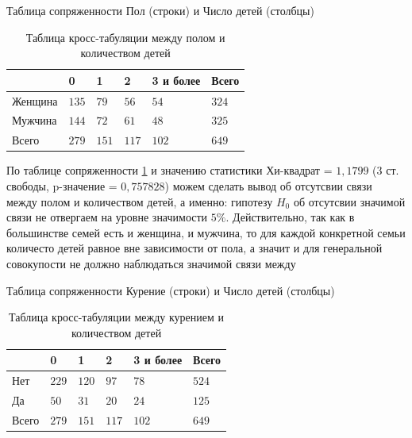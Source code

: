 \documentclass[a4paper,12pt]{article}
\begin{document}
\begin{table}[H]
	\begin{center}
		Таблица сопряженности Пол (строки) и Число детей (столбцы)\\
		
		\vspace{8pt}
		
		\begin{tabular}{|l|l|l|l|l|l|}
			\hline
			& 0 & 1 & 2 & 3 и более & Всего \\[1ex]
			\hline
			Женщина & $135$ & $79$ & $56$ & $54$ & $324$\\
			\hline
			Мужчина & $144$ & $72$ & $61$ & $48$ & $325$\\[1ex]
			\hline
			Всего & $279$ & $151$ & $117$ & $102$ & $649$\\
			\hline
		\end{tabular}
		\caption{Таблица кросс-табуляции между полом и количеством детей}
		\label{tab:cross2}
	\end{center}
\end{table}

По таблице сопряженности \ref{tab:cross2} и значению статистики Хи-квадрат = $1,1799$ (3 ст. свободы, p-значение = $0,757828$) можем сделать вывод об отсутсвии связи между полом и количеством детей, а именно: гипотезу $H_0$ об отсутсвии значимой связи не отвергаем на уровне значимости $5\%$. Действительно, так как в большинстве семей есть и женщина, и мужчина, то для каждой конкретной семьи количесто детей равное вне зависимости от пола, а значит и для генеральной совокупости не должно наблюдаться значимой связи между  

\begin{table}[H]
	\begin{center}
		Таблица сопряженности Курение (строки) и Число детей (столбцы)\\
		
		\vspace{8pt}
		
		\begin{tabular}{|l|l|l|l|l|l|}
			\hline
			& 0 & 1 & 2 & 3 и более & Всего \\[1ex]
			\hline
			Нет & $229$ & $120$ & $97$ & $78$ & $524$\\
			\hline
			Да & $50$ & $31$ & $20$ & $24$ & $125$\\[1ex]
			\hline
			Всего & $279$ & $151$ & $117$ & $102$ & $649$\\
			\hline
		\end{tabular}
		\caption{Таблица кросс-табуляции между курением и количеством детей}
		\label{tab:cross3}
	\end{center}
\end{table}
\end{document}
